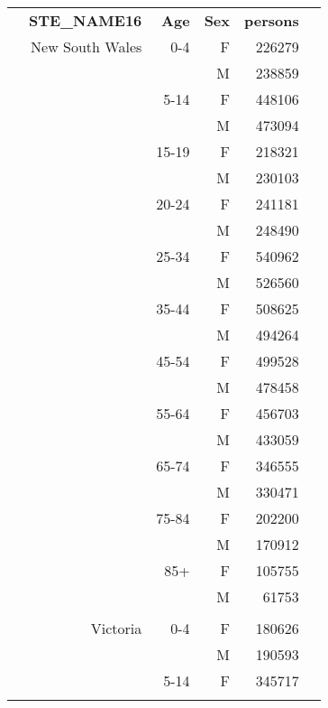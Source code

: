 \begin{tabular}{@{}c@{}rrrr@{}c@{}}
\toprule
  &         \textbf{STE\_NAME16} & \textbf{Age} & \textbf{Sex} & \textbf{persons}&\\ 
\phantom{.} &                New South Wales &    0-4 &  F &  226279 &\tabularnewline\relax 
\phantom{.} &                                &        &  M &  238859 &\tabularnewline\relax 
\phantom{.} &                                &   5-14 &  F &  448106 &\tabularnewline\relax 
\phantom{.} &                                &        &  M &  473094 &\tabularnewline\relax 
\phantom{.} &                                &  15-19 &  F &  218321 &\tabularnewline\relax 
\phantom{.} &                                &        &  M &  230103 &\tabularnewline\relax 
\phantom{.} &                                &  20-24 &  F &  241181 &\tabularnewline\relax 
\phantom{.} &                                &        &  M &  248490 &\tabularnewline\relax 
\phantom{.} &                                &  25-34 &  F &  540962 &\tabularnewline\relax 
\phantom{.} &                                &        &  M &  526560 &\tabularnewline\relax 
\phantom{.} &                                &  35-44 &  F &  508625 &\tabularnewline\relax 
\phantom{.} &                                &        &  M &  494264 &\tabularnewline\relax 
\phantom{.} &                                &  45-54 &  F &  499528 &\tabularnewline\relax 
\phantom{.} &                                &        &  M &  478458 &\tabularnewline\relax 
\phantom{.} &                                &  55-64 &  F &  456703 &\tabularnewline\relax 
\phantom{.} &                                &        &  M &  433059 &\tabularnewline\relax 
\phantom{.} &                                &  65-74 &  F &  346555 &\tabularnewline\relax 
\phantom{.} &                                &        &  M &  330471 &\tabularnewline\relax 
\phantom{.} &                                &  75-84 &  F &  202200 &\tabularnewline\relax 
\phantom{.} &                                &        &  M &  170912 &\tabularnewline\relax 
\phantom{.} &                                &    85+ &  F &  105755 &\tabularnewline\relax 
\phantom{.} &                                &        &  M &   61753 &\tabularnewline\relax 
\phantom{.} &            &            &            &            &\tabularnewline[0.5\baselineskip]
\phantom{.} &                       Victoria &    0-4 &  F &  180626 &\tabularnewline\relax 
\phantom{.} &                                &        &  M &  190593 &\tabularnewline\relax 
\phantom{.} &                                &   5-14 &  F &  345717 &\tabularnewline\relax 

\end{tabular}
